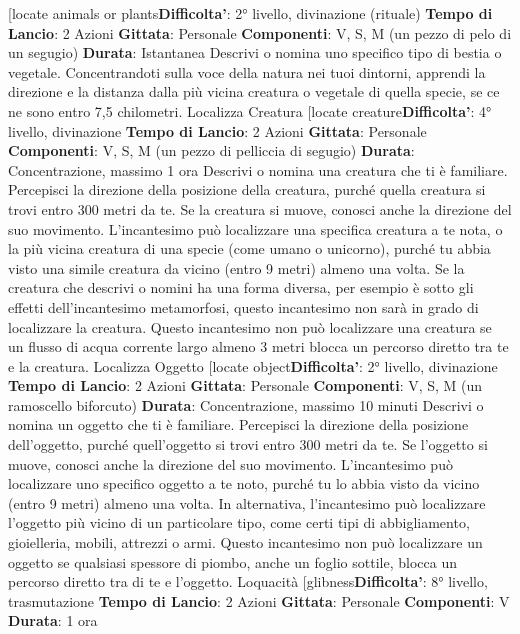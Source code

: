 \begin{multicols}{2}
[locate animals or plants\textbf{Difficolta'}:
2° livello, divinazione (rituale)
\textbf{Tempo di Lancio}: 2 Azioni
\textbf{Gittata}: Personale
\textbf{Componenti}: V, S, M (un pezzo di pelo di un segugio)
\textbf{Durata}: Istantanea
Descrivi o nomina uno specifico tipo di bestia o
vegetale. Concentrandoti sulla voce della natura nei
tuoi dintorni, apprendi la direzione e la distanza dalla
più vicina creatura o vegetale di quella specie, se ce ne
sono entro 7,5 chilometri.
Localizza Creatura
[locate creature\textbf{Difficolta'}:
4° livello, divinazione
\textbf{Tempo di Lancio}: 2 Azioni
\textbf{Gittata}: Personale
\textbf{Componenti}: V, S, M (un pezzo di pelliccia di segugio)
\textbf{Durata}: Concentrazione, massimo 1 ora
Descrivi o nomina una creatura che ti è familiare.
Percepisci la direzione della posizione della creatura,
purché quella creatura si trovi entro 300 metri da te. Se
la creatura si muove, conosci anche la direzione del
suo movimento.
L’incantesimo può localizzare una specifica creatura a
te nota, o la più vicina creatura di una specie (come
umano o unicorno), purché tu abbia visto una simile
creatura da vicino (entro 9 metri) almeno una volta. Se
la creatura che descrivi o nomini ha una forma diversa,
per esempio è sotto gli effetti dell’incantesimo
metamorfosi, questo incantesimo non sarà in grado di
localizzare la creatura.
Questo incantesimo non può localizzare una creatura
se un flusso di acqua corrente largo almeno 3 metri
blocca un percorso diretto tra te e la creatura.
Localizza Oggetto
[locate object\textbf{Difficolta'}:
2° livello, divinazione
\textbf{Tempo di Lancio}: 2 Azioni
\textbf{Gittata}: Personale
\textbf{Componenti}: V, S, M (un ramoscello biforcuto)
\textbf{Durata}: Concentrazione, massimo 10 minuti
Descrivi o nomina un oggetto che ti è familiare.
Percepisci la direzione della posizione dell’oggetto,
purché quell’oggetto si trovi entro 300 metri da te. Se
l’oggetto si muove, conosci anche la direzione del suo
movimento.
L’incantesimo può localizzare uno specifico oggetto a te
noto, purché tu lo abbia visto da vicino (entro 9 metri)
almeno una volta. In alternativa, l’incantesimo può
localizzare l’oggetto più vicino di un particolare tipo,
come certi tipi di abbigliamento, gioielleria, mobili,
attrezzi o armi.
Questo incantesimo non può localizzare un oggetto se
qualsiasi spessore di piombo, anche un foglio sottile,
blocca un percorso diretto tra di te e l’oggetto.
Loquacità
[glibness\textbf{Difficolta'}:
8° livello, trasmutazione
\textbf{Tempo di Lancio}: 2 Azioni
\textbf{Gittata}: Personale
\textbf{Componenti}: V
\textbf{Durata}: 1 ora

\end{multicols}

